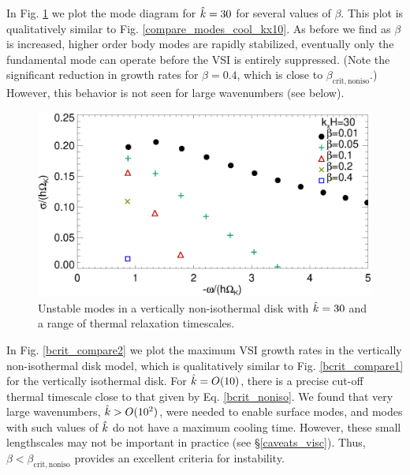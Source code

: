 
In Fig. \ref{compare_modes_vnoniso_kx10} we plot the mode diagram for
$\hat{k}=30$ for several values of $\beta$. This plot is 
qualitatively similar to Fig. \ref{compare_modes_cool_kx10}. As before
we find as $\beta$ is increased, higher order body modes are rapidly
stabilized, eventually only the fundamental mode can operate before
the VSI is entirely suppressed. (Note the significant reduction in
growth rates for $\beta=0.4$, which is close to
$\beta_\mathrm{crit,noniso}$.) However, this behavior is not seen for 
large wavenumbers (see below). 

\begin{figure}
  \includegraphics[width=\linewidth,clip=true,trim=0cm 0cm 0cm
  0cm]{figures/compare_modes_Gam1.3_kx30.ps}
  \caption{Unstable modes in a vertically non-isothermal disk with
    $\hat{k}=30$ and a range of thermal relaxation timescales.  
    \label{compare_modes_vnoniso_kx10}}
\end{figure} 

In Fig. \ref{bcrit_compare2} we plot the maximum VSI growth
rates in the vertically non-isothermal disk model, which is
qualitatively similar to Fig. \ref{bcrit_compare1} for the vertically
isothermal disk. For $\hat{k}=O(10)$, there is a   
precise cut-off thermal timescale close to that given by
Eq. \ref{bcrit_noniso}. We found that very large wavenumbers, 
$\hat{k} > O(10^2)$, were needed to enable surface modes, and modes with
such values of $\hat{k}$ do not have a maximum cooling time. However,
these small lengthscales may not be important in practice
(see \S\ref{caveats_visc}). Thus, $\beta<\beta_\mathrm{crit,noniso}$ 
provides an excellent criteria for instability.   

